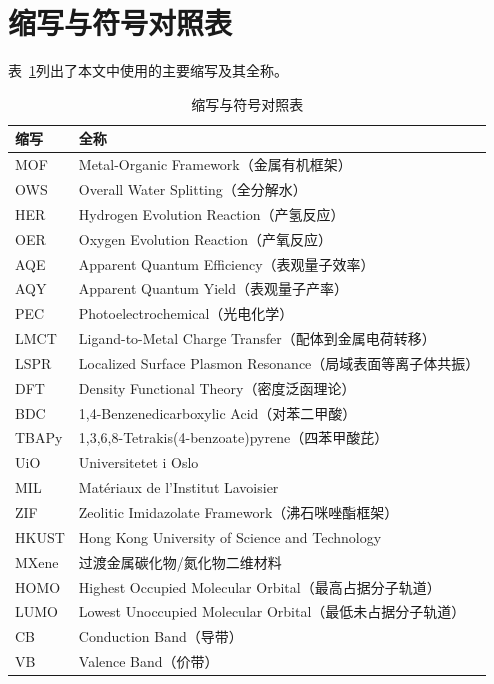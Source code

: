 \appendix

\section{缩写与符号对照表}\label{sec:appendix}

表~\ref{tab:abbreviations}列出了本文中使用的主要缩写及其全称。

\begin{table}[htbp]
\centering
\caption{缩写与符号对照表}
\label{tab:abbreviations}
\begin{tabular}{ll}
\toprule
缩写 & 全称 \\
\midrule
MOF & Metal-Organic Framework（金属有机框架） \\
OWS & Overall Water Splitting（全分解水） \\
HER & Hydrogen Evolution Reaction（产氢反应） \\
OER & Oxygen Evolution Reaction（产氧反应） \\
AQE & Apparent Quantum Efficiency（表观量子效率） \\
AQY & Apparent Quantum Yield（表观量子产率） \\
PEC & Photoelectrochemical（光电化学） \\
LMCT & Ligand-to-Metal Charge Transfer（配体到金属电荷转移） \\
LSPR & Localized Surface Plasmon Resonance（局域表面等离子体共振） \\
DFT & Density Functional Theory（密度泛函理论） \\
BDC & 1,4-Benzenedicarboxylic Acid（对苯二甲酸） \\
TBAPy & 1,3,6,8-Tetrakis(4-benzoate)pyrene（四苯甲酸芘） \\
UiO & Universitetet i Oslo \\
MIL & Mat\'{e}riaux de l'Institut Lavoisier \\
ZIF & Zeolitic Imidazolate Framework（沸石咪唑酯框架） \\
HKUST & Hong Kong University of Science and Technology \\
MXene & 过渡金属碳化物/氮化物二维材料 \\
HOMO & Highest Occupied Molecular Orbital（最高占据分子轨道） \\
LUMO & Lowest Unoccupied Molecular Orbital（最低未占据分子轨道） \\
CB & Conduction Band（导带） \\
VB & Valence Band（价带） \\
\bottomrule
\end{tabular}
\end{table}

